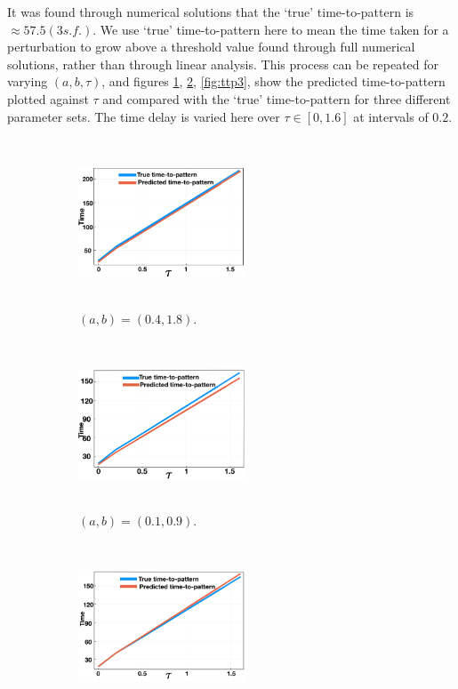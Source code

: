 It was found through numerical solutions that the `true' time-to-pattern is $\approx57.5(3s.f.)$.
We use `true' time-to-pattern here to mean the time taken for a perturbation to grow above a threshold value found through full numerical solutions, rather than through linear analysis. This process can be repeated for varying $(a,b,\tau)$, and figures \ref{fig:ttp1}, \ref{fig:ttp2}, \ref{fig:ttp3}, show the predicted time-to-pattern plotted against $\tau$ and compared with the `true' time-to-pattern for three different parameter sets. The time delay is varied here over $\tau\in[0,1.6]$ at intervals of $0.2$.

\begin{figure}[H]
    \centering
    \begin{subfigure}[t]{0.32\textwidth}
        \centering
        \includegraphics[width=5cm,height=5cm]{ttp1.png}
        \caption{$(a,b)=(0.4,1.8)$.}
        \label{fig:ttp1}
    \end{subfigure}
    \hfill
    \begin{subfigure}[t]{0.32\textwidth}
        \centering
        \includegraphics[width=5cm,height=5cm]{ttp2.png}
        \caption{$(a,b)=(0.1,0.9)$.}
        \label{fig:ttp2}
    \end{subfigure}
    \hfill
    \begin{subfigure}[t]{0.32\textwidth}
        \centering
        \includegraphics[width=5cm,height=5cm]{ttp3.png}

\end{subfigure}
\end{figure}
